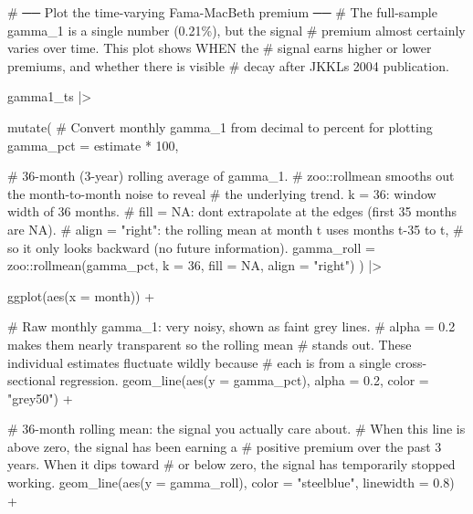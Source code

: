 \documentclass[
  letterpaper,
  DIV=11,
  numbers=noendperiod]{scrartcl}
\newenvironment{Shaded}{\begin{snugshade}}{\end{snugshade}}
\newcommand{\AttributeTok}[1]{\textcolor[rgb]{0.40,0.45,0.13}{#1}}
\newcommand{\CommentTok}[1]{\textcolor[rgb]{0.37,0.37,0.37}{#1}}
\newcommand{\ConstantTok}[1]{\textcolor[rgb]{0.56,0.35,0.01}{#1}}
\newcommand{\DecValTok}[1]{\textcolor[rgb]{0.68,0.00,0.00}{#1}}
\newcommand{\FloatTok}[1]{\textcolor[rgb]{0.68,0.00,0.00}{#1}}
\newcommand{\FunctionTok}[1]{\textcolor[rgb]{0.28,0.35,0.67}{#1}}
\newcommand{\NormalTok}[1]{\textcolor[rgb]{0.00,0.23,0.31}{#1}}
\newcommand{\SpecialCharTok}[1]{\textcolor[rgb]{0.37,0.37,0.37}{#1}}
\newcommand{\StringTok}[1]{\textcolor[rgb]{0.13,0.47,0.30}{#1}}
\begin{document}
\begin{Shaded}
\begin{Highlighting}[]
\CommentTok{\# ── Plot the time{-}varying Fama{-}MacBeth premium ──}
\CommentTok{\# The full{-}sample gamma\_1 is a single number (0.21\%), but the signal}
\CommentTok{\# premium almost certainly varies over time. This plot shows WHEN the}
\CommentTok{\# signal earns higher or lower premiums, and whether there is visible}
\CommentTok{\# decay after JKKL\textquotesingle{}s 2004 publication.}

\NormalTok{gamma1\_ts }\SpecialCharTok{|\textgreater{}}

  \FunctionTok{mutate}\NormalTok{(}
    \CommentTok{\# Convert monthly gamma\_1 from decimal to percent for plotting}
    \AttributeTok{gamma\_pct =}\NormalTok{ estimate }\SpecialCharTok{*} \DecValTok{100}\NormalTok{,}

    \CommentTok{\# 36{-}month (3{-}year) rolling average of gamma\_1.}
    \CommentTok{\# zoo::rollmean smooths out the month{-}to{-}month noise to reveal}
    \CommentTok{\# the underlying trend. k = 36: window width of 36 months.}
    \CommentTok{\# fill = NA: don\textquotesingle{}t extrapolate at the edges (first 35 months are NA).}
    \CommentTok{\# align = "right": the rolling mean at month t uses months t{-}35 to t,}
    \CommentTok{\#   so it only looks backward (no future information).}
    \AttributeTok{gamma\_roll =}\NormalTok{ zoo}\SpecialCharTok{::}\FunctionTok{rollmean}\NormalTok{(gamma\_pct, }\AttributeTok{k =} \DecValTok{36}\NormalTok{, }\AttributeTok{fill =} \ConstantTok{NA}\NormalTok{, }\AttributeTok{align =} \StringTok{"right"}\NormalTok{)}
\NormalTok{  ) }\SpecialCharTok{|\textgreater{}}

  \FunctionTok{ggplot}\NormalTok{(}\FunctionTok{aes}\NormalTok{(}\AttributeTok{x =}\NormalTok{ month)) }\SpecialCharTok{+}

  \CommentTok{\# Raw monthly gamma\_1: very noisy, shown as faint grey lines.}
  \CommentTok{\# alpha = 0.2 makes them nearly transparent so the rolling mean}
  \CommentTok{\# stands out. These individual estimates fluctuate wildly because}
  \CommentTok{\# each is from a single cross{-}sectional regression.}
  \FunctionTok{geom\_line}\NormalTok{(}\FunctionTok{aes}\NormalTok{(}\AttributeTok{y =}\NormalTok{ gamma\_pct), }\AttributeTok{alpha =} \FloatTok{0.2}\NormalTok{, }\AttributeTok{color =} \StringTok{"grey50"}\NormalTok{) }\SpecialCharTok{+}

  \CommentTok{\# 36{-}month rolling mean: the signal you actually care about.}
  \CommentTok{\# When this line is above zero, the signal has been earning a}
  \CommentTok{\# positive premium over the past 3 years. When it dips toward}
  \CommentTok{\# or below zero, the signal has temporarily stopped working.}
  \FunctionTok{geom\_line}\NormalTok{(}\FunctionTok{aes}\NormalTok{(}\AttributeTok{y =}\NormalTok{ gamma\_roll), }\AttributeTok{color =} \StringTok{"steelblue"}\NormalTok{, }\AttributeTok{linewidth =} \FloatTok{0.8}\NormalTok{) }\SpecialCharTok{+}


\end{Highlighting}
\end{Shaded}
\end{document}
